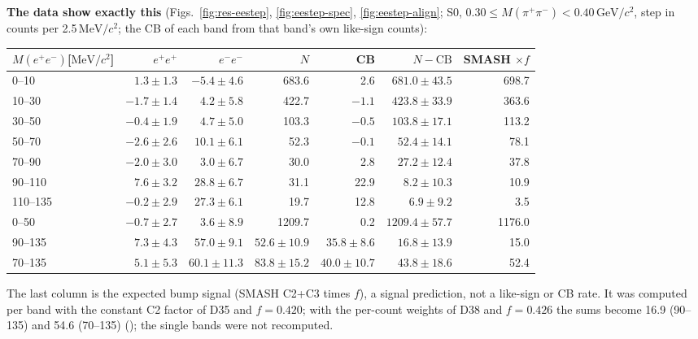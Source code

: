\documentclass[11pt,a4paper]{article}
\newcommand{\Mee}{\ensuremath{M(e^{+}e^{-})}\xspace}
\newcommand{\Mpipi}{\ensuremath{M(\pi^{+}\pi^{-})}\xspace}
\newcommand{\GeVcc}{\ensuremath{\mathrm{GeV}/c^{2}}\xspace}
\newcommand{\MeVcc}{\ensuremath{\mathrm{MeV}/c^{2}}\xspace}
\newcommand{\code}[1]{\texttt{\detokenize{#1}}}
\begin{document}
\textbf{The data show exactly this} (Figs.~\ref{fig:res-eestep}, \ref{fig:eestep-spec}, \ref{fig:eestep-align}; S0, $0.30\le\Mpipi<0.40$\,\GeVcc,
step in counts per 2.5\,\MeVcc; the CB of each band from that band's own like-sign counts):
\begin{center}\small
\begin{tabular}{@{}l r r r r r r@{}}
\toprule
\Mee [\MeVcc] & $e^+e^+$ & $e^-e^-$ & $N$ & CB & $N-\mathrm{CB}$ & SMASH $\times f$ \\
\midrule
0--10 & $1.3\pm1.3$ & $-5.4\pm4.6$ & 683.6 & 2.6 & $681.0\pm43.5$ & 698.7 \\
10--30 & $-1.7\pm1.4$ & $4.2\pm5.8$ & 422.7 & $-1.1$ & $423.8\pm33.9$ & 363.6 \\
30--50 & $-0.4\pm1.9$ & $4.7\pm5.0$ & 103.3 & $-0.5$ & $103.8\pm17.1$ & 113.2 \\
50--70 & $-2.6\pm2.6$ & $10.1\pm6.1$ & 52.3 & $-0.1$ & $52.4\pm14.1$ & 78.1 \\
70--90 & $-2.0\pm3.0$ & $3.0\pm6.7$ & 30.0 & 2.8 & $27.2\pm12.4$ & 37.8 \\
90--110 & $7.6\pm3.2$ & $28.8\pm6.7$ & 31.1 & 22.9 & $8.2\pm10.3$ & 10.9 \\
110--135 & $-0.2\pm2.9$ & $27.3\pm6.1$ & 19.7 & 12.8 & $6.9\pm9.2$ & 3.5 \\
\midrule
0--50 & $-0.7\pm2.7$ & $3.6\pm8.9$ & 1209.7 & 0.2 & $1209.4\pm57.7$ & 1176.0 \\
90--135 & $7.3\pm4.3$ & $57.0\pm9.1$ & $52.6\pm10.9$ & $35.8\pm8.6$ & $16.8\pm13.9$ & 15.0 \\
70--135 & $5.1\pm5.3$ & $60.1\pm11.3$ & $83.8\pm15.2$ & $40.0\pm10.7$ & $43.8\pm18.6$ & 52.4 \\
\bottomrule
\end{tabular}
\end{center}
The last column is the expected bump signal (SMASH C2+C3 times $f$), a signal prediction, not a like-sign or CB rate. It was computed per band
with the constant C2 factor of D35 and $f=0.420$; with the per-count weights of D38 and $f=0.426$ the sums become 16.9 (90--135) and 54.6
(70--135) (\code{eestep_band_v3.log}); the single bands were not recomputed.
\end{document}
